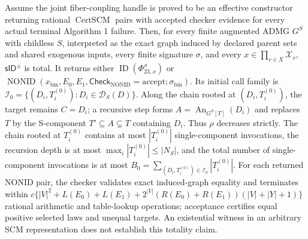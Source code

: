 {%
Assume the joint fiber-coupling handle is proved to be an effective constructor returning rational \(\operatorname{CertSCM}\) pairs with accepted checker evidence for every actual terminal Algorithm 1 failure. Then, for every finite augmented ADMG \(G^S\) with childless \(S\), interpreted as the exact graph induced by declared parent sets and shared exogenous inputs, every finite signature \(\sigma\), and every \(x\in\prod_{v\in X}\mathcal X_v\), \(\mathsf{sID}^{\pm}\) is total. It returns either \(\operatorname{ID}(\Phi_{23,x}^{\sigma})\) or \(\operatorname{NONID}(x_{\mathrm{bin}},E_0,E_1,\mathsf{Check}_{\mathrm{NONID}}=\mathrm{accept};\sigma_{\mathrm{bin}})\). Its initial call family is \(\mathcal I_0=\{(D_i,T_i^{(0)}):D_i\in\mathcal D_S(D)\}\). Along the chain rooted at \((D_i,T_i^{(0)})\), the target remains \(C=D_i\); a recursive step forms \(A=\operatorname{An}_{G^S[T]}(D_i)\) and replaces \(T\) by the S-component \(T'\subseteq A\subsetneq T\) containing \(D_i\). Thus \(\rho\) decreases strictly. The chain rooted at \(T_i^{(0)}\) contains at most \(|T_i^{(0)}|\) single-component invocations, the recursion depth is at most \(\max_i|T_i^{(0)}|\le|N_S|\), and the total number of single-component invocations is at most \(B_0=\sum_{(D_i,T_i^{(0)})\in\mathcal I_0}|T_i^{(0)}|\). For each returned NONID pair, the checker validates exact induced-graph equality and terminates within \(c\{|V|^2+L(E_0)+L(E_1)+2^{|V|}(R(E_0)+R(E_1))(|V|+|Y|+1)\}\) rational arithmetic and table-lookup operations; acceptance certifies equal positive selected laws and unequal targets. An existential witness in an arbitrary SCM representation does not establish this totality claim.

}
